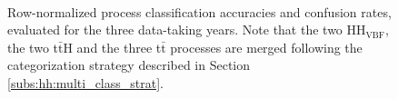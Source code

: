 \documentclass[../main.tex]{subfiles}
\begin{document}
\begin{figure}[h!]
\begin{center}
 \\
\end{center}
\caption{Row-normalized process classification accuracies and confusion rates, evaluated for the three data-taking years. Note that the two $\text{HH}_{\text{VBF}}$, the two t$\bar{\text{t}}$H and the three t$\bar{\text{t}}$ processes are merged following the categorization strategy described in Section \ref{subs:hh:multi_class_strat}.}
\label{hh:fig:multi_confusion}
\end{figure}


%
%
\end{document}
